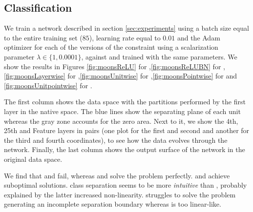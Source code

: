 \subsection{Classification}\label{subsec:classification}

We train a network described in section \ref{sec:experiments} using a batch size equal to the entire training set ($85$), learning rate equal to $0.01$ and the Adam optimizer \cite{adam} for each of the versions of the constraint using a scalarization parameter $\lambda \in \{1, 0.0001\}$, against \ReLU and \ReLUBN trained with the same parameters. We show the results in Figures \ref{fig:moonsReLU} for \ReLU,\ref{fig:moonsReLUBN} for \ReLUBN,\ref{fig:moonsLayerwise} for \SepLayer,\ref{fig:moonsUnitwise} for \SepUnit,\ref{fig:moonsPointwise} for \SepPoint and \ref{fig:moonsUnitpointwise} for \SepUnitPoint. 

The first column shows the data space with the partitions performed by the first layer in the native space. The blue lines show the separating plane of each unit whereas the gray zone accounts for the zero area. Next to it, we show the 4th, 25th and Feature layers in pairs (one plot for the first and second and another for the third and fourth coordinates), to see how the data evolves through the network. Finally, the last column shows the output surface of the network in the original data space. 

We find that \ReLU and \ReLUBN fail, whereas \SepLayer and \SepUnitPoint solve the problem perfectly. \SepUnit and \SepPoint achieve suboptimal solutions. \SepLayer class separation seems to be more \emph{intuitive} than \SepUnitPoint, probably explained by the latter increased non-linearity. \SepUnit struggles to solve the problem generating an incomplete separation boundary whereas \SepPoint is too linear-like.

